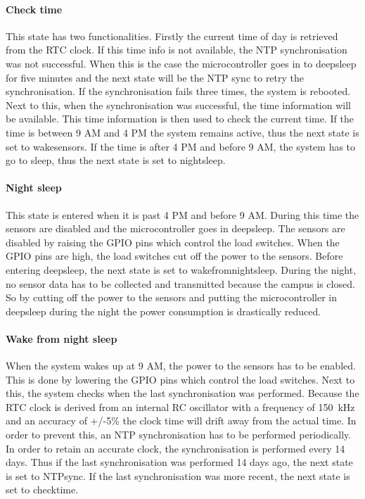\documentclass[11pt,a4paper]{article}
\begin{document}
\paragraph{Check time}
This state has two functionalities. Firstly the current time of day is retrieved from the RTC clock. If this time info is not available, the NTP synchronisation was not successful. When this is the case the microcontroller goes in to deepsleep for five minutes and the next state will be the NTP sync to retry the synchronisation. If the synchronisation fails three times, the system is rebooted. Next to this, when the synchronisation was successful, the time information will be available. This time information is then used to check the current time. If the time is between 9 AM and 4 PM the system remains active, thus the next state is set to wakesensors. If the time is after 4 PM and before 9 AM, the system has to go to sleep, thus the next state is set to nightsleep.

\paragraph{Night sleep}
This state is entered when it is past 4 PM and before 9 AM. During this time the sensors are disabled and the microcontroller goes in deepsleep. The sensors are disabled by raising the GPIO pins which control the load switches. When the GPIO pins are high, the load switches cut off the power to the sensors. Before entering deepsleep, the next state is set to wakefromnightsleep. During the night, no sensor data has to be collected and transmitted because the campus is closed. So by cutting off the power to the sensors and putting the microcontroller in deepsleep during the night the power consumption is drastically reduced. 

\paragraph{Wake from night sleep}
When the system wakes up at 9 AM, the power to the sensors has to be enabled. This is done by lowering the GPIO pins which control the load switches. Next to this, the system checks when the last synchronisation was performed. Because the RTC clock is derived from an internal RC oscillator with a frequency of \SI{150}{\kilo\hertz} and an accuracy of +/-5\% the clock time will drift away from the actual time. In order to prevent this, an NTP synchronisation has to be performed periodically. In order to retain an accurate clock, the synchronisation is performed every 14 days. Thus if the last synchronisation was performed 14 days ago, the next state is set to NTPsync. If the last synchronisation was more recent, the next state is set to checktime. 
\end{document}
